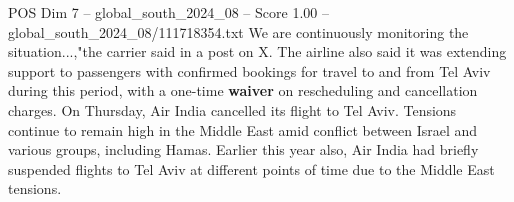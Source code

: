 \begin{textsample}{POS Dim 7 – global\_south\_2024\_08 – Score 1.00 – global\_south\_2024\_08/111718354.txt}
We are continuously monitoring the situation...,"the carrier said in a post on X.
The airline also said it was extending support to passengers with confirmed bookings for travel to and from Tel Aviv during this period, with a one-time \textbf{waiver} on rescheduling and cancellation charges.
On Thursday, Air India cancelled its flight to Tel Aviv.
Tensions continue to remain high in the Middle East amid conflict between Israel and various groups, including Hamas.
Earlier this year also, Air India had briefly suspended flights to Tel Aviv at different points of time due to the Middle East tensions.

\end{textsample}
